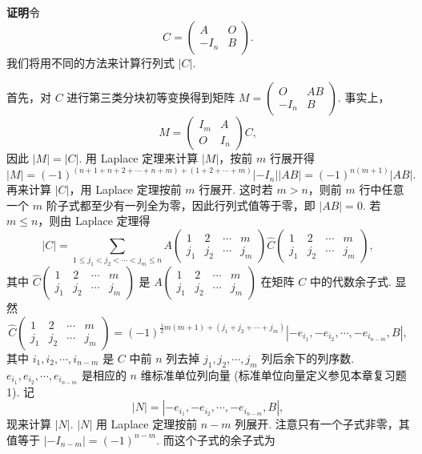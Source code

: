 \documentclass[UTF8, 12pt, fontset=fandol, oneside]{ctexart}
\begin{document}
\noindent\textbf{证明}\quad 令
\[
C=\left(\begin{array}{cc}
A & O\\
-I_n & B
\end{array}\right).
\]
我们将用不同的方法来计算行列式 $|C|$.

首先，对 $C$ 进行第三类分块初等变换得到矩阵 $M=\left(\begin{array}{cc}O&AB\\ -I_n&B\end{array}\right)$. 事实上，
\[
M=\left(\begin{array}{cc}
I_m & A\\
O & I_n
\end{array}\right)C,
\]
因此 $|M|=|C|$. 用 Laplace 定理来计算 $|M|$，按前 $m$ 行展开得
\[
|M|=(-1)^{(n+1+n+2+\cdots+n+m)+(1+2+\cdots+m)}|-I_n||AB|=(-1)^{n(m+1)}|AB|.
\]
再来计算 $|C|$，用 Laplace 定理按前 $m$ 行展开. 这时若 $m>n$，则前 $m$ 行中任意一个 $m$ 阶子式都至少有一列全为零，因此行列式值等于零，即 $|AB|=0$. 若 $m\leq n$，则由 Laplace 定理得
\[
|C|=\sum_{1\leq j_1<j_2<\cdots<j_m\leq n}
A\left(\begin{array}{cccc}
1 & 2 & \cdots & m\\
j_1 & j_2 & \cdots & j_m
\end{array}\right)
\widehat{C}\left(\begin{array}{cccc}
1 & 2 & \cdots & m\\
j_1 & j_2 & \cdots & j_m
\end{array}\right),
\]
其中 $\widehat{C}\left(\begin{array}{cccc}1&2&\cdots&m\\ j_1&j_2&\cdots&j_m\end{array}\right)$ 是 $A\left(\begin{array}{cccc}1&2&\cdots&m\\ j_1&j_2&\cdots&j_m\end{array}\right)$ 在矩阵 $C$ 中的代数余子式. 显然
\[
\widehat{C}\left(\begin{array}{cccc}
1 & 2 & \cdots & m\\
j_1 & j_2 & \cdots & j_m
\end{array}\right)
=(-1)^{\frac12 m(m+1)+(j_1+j_2+\cdots+j_m)}
|-e_{i_1},-e_{i_2},\cdots,-e_{i_{n-m}},B|,
\]
其中 $i_1,i_2,\cdots,i_{n-m}$ 是 $C$ 中前 $n$ 列去掉 $j_1,j_2,\cdots,j_m$ 列后余下的列序数. $e_{i_1},e_{i_2},\cdots,e_{i_{n-m}}$ 是相应的 $n$ 维标准单位列向量 (标准单位向量定义参见本章复习题 1). 记
\[
|N|=|-e_{i_1},-e_{i_2},\cdots,-e_{i_{n-m}},B|,
\]
现来计算 $|N|$. $|N|$ 用 Laplace 定理按前 $n-m$ 列展开. 注意只有一个子式非零，其值等于 $|-I_{n-m}|=(-1)^{n-m}$. 而这个子式的余子式为
\end{document}
